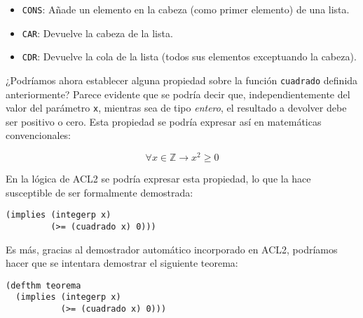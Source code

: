 \documentclass[a4paper,10pt]{article}
\begin{document}
\par\vspace{10pt}

\begin{itemize}
	\item \texttt{CONS}: Añade un elemento en la cabeza (como primer elemento) de una lista.
	\item \texttt{CAR}: Devuelve la cabeza de la lista.
	\item \texttt{CDR}: Devuelve la cola de la lista (todos sus elementos exceptuando la cabeza).
\end{itemize}

\par\vspace{10pt}

¿Podríamos ahora establecer alguna propiedad sobre la función \texttt{cuadrado} definida anteriormente? Parece evidente que se podría decir que, independientemente del valor del parámetro \texttt{x}, mientras sea de tipo \emph{entero}, el resultado a devolver debe ser positivo o cero. Esta propiedad se podría expresar así en matemáticas convencionales:

\par\vspace{10pt}

$$
\forall x \in \mathbb{Z} \longrightarrow x^2 \geq 0
$$

\par\vspace{10pt}

En la lógica de ACL2 se podría expresar esta propiedad, lo que la hace susceptible de ser formalmente demostrada:

\par\vspace{10pt}

\begin{lstlisting}[language=clips]
(implies (integerp x)
         (>= (cuadrado x) 0)))
\end{lstlisting}

\par\vspace{10pt}

Es más, gracias al demostrador automático incorporado en ACL2, podríamos hacer que se intentara demostrar el siguiente teorema:

\par\vspace{10pt}

\begin{lstlisting}[language=clips]
(defthm teorema
  (implies (integerp x)
           (>= (cuadrado x) 0)))
\end{lstlisting}
\end{document}
